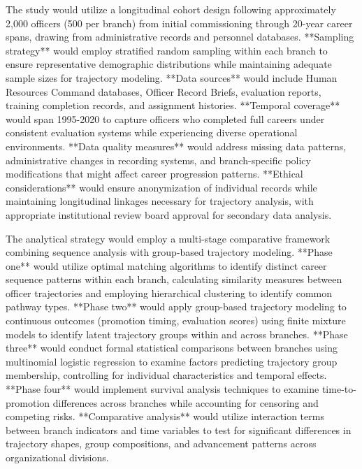 \documentclass[main.tex]{subfiles}
\begin{document}

The study would utilize a longitudinal cohort design following approximately 2,000 officers (500 per branch) from initial commissioning through 20-year career spans, drawing from administrative records and personnel databases. **Sampling strategy** would employ stratified random sampling within each branch to ensure representative demographic distributions while maintaining adequate sample sizes for trajectory modeling. **Data sources** would include Human Resources Command databases, Officer Record Briefs, evaluation reports, training completion records, and assignment histories. **Temporal coverage** would span 1995-2020 to capture officers who completed full careers under consistent evaluation systems while experiencing diverse operational environments. **Data quality measures** would address missing data patterns, administrative changes in recording systems, and branch-specific policy modifications that might affect career progression patterns. **Ethical considerations** would ensure anonymization of individual records while maintaining longitudinal linkages necessary for trajectory analysis, with appropriate institutional review board approval for secondary data analysis.


The analytical strategy would employ a multi-stage comparative framework combining sequence analysis with group-based trajectory modeling. **Phase one** would utilize optimal matching algorithms to identify distinct career sequence patterns within each branch, calculating similarity measures between officer trajectories and employing hierarchical clustering to identify common pathway types. **Phase two** would apply group-based trajectory modeling to continuous outcomes (promotion timing, evaluation scores) using finite mixture models to identify latent trajectory groups within and across branches. **Phase three** would conduct formal statistical comparisons between branches using multinomial logistic regression to examine factors predicting trajectory group membership, controlling for individual characteristics and temporal effects. **Phase four** would implement survival analysis techniques to examine time-to-promotion differences across branches while accounting for censoring and competing risks. **Comparative analysis** would utilize interaction terms between branch indicators and time variables to test for significant differences in trajectory shapes, group compositions, and advancement patterns across organizational divisions.
\end{document}

